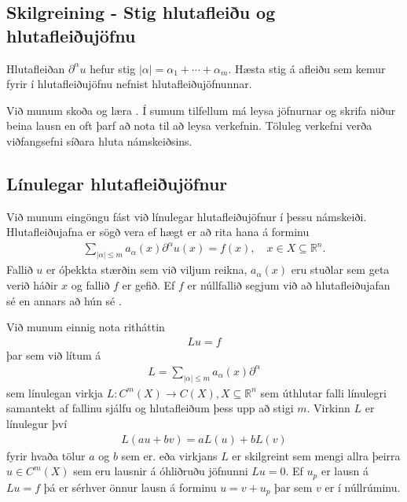 \documentclass[a4paper,10pt,icelandic]{sphinxmanual}
\begin{document}
\subsection{Skilgreining - Stig hlutafleiðu og hlutafleiðujöfnu}
\label{\detokenize{Kafli01:skilgreining-stig-hlutafleiu-og-hlutafleiujofnu}}
Hlutafleiðan \(\partial^\alpha u\) hefur stig \(|\alpha| = \alpha_1 + \cdots + \alpha_m\).  Hæsta stig á afleiðu sem kemur fyrir í hlutafleiðujöfnu nefnist  hlutafleiðujöfnunnar.

Við munum skoða  og læra . Í sumum tilfellum má leysa jöfnurnar og skrifa niður beina lausn en oft þarf að nota  til að leysa verkefnin. Töluleg verkefni verða viðfangsefni síðara hluta námskeiðsins.


\subsection{Línulegar hlutafleiðujöfnur}
\label{\detokenize{Kafli01:linulegar-hlutafleiujofnur}}
Við munum eingöngu fást við línulegar hlutafleiðujöfnur í þessu námskeiði. Hlutafleiðujafna er sögð vera  ef hægt er að rita hana á forminu
\begin{equation*}
\begin{split}\sum_{|\alpha|\leq m} a_\alpha(x) \partial^\alpha u(x) = f(x), \quad x\in X \subseteq \mathbb{R}^n.\end{split}
\end{equation*}
Fallið \(u\) er óþekkta stærðin sem við viljum reikna, \(a_\alpha(x)\) eru stuðlar sem geta verið háðir \(x\) og fallið \(f\) er gefið. Ef \(f\) er núllfallið segjum við að hlutafleiðujafan sé  en annars að hún sé .

Við munum einnig nota ritháttin
\begin{equation*}
\begin{split}Lu = f\end{split}
\end{equation*}
þar sem við lítum á
\begin{equation*}
\begin{split}L = \sum_{|\alpha|\leq m} a_\alpha(x) \partial^\alpha\end{split}
\end{equation*}
sem línulegan virkja \(L: C^m(X) \to C(X), X\subseteq \mathbb{R}^n\) sem úthlutar falli línulegri samantekt af fallinu sjálfu og hlutafleiðum þess upp að stigi \(m\). Virkinn \(L\) er línulegur því
\begin{equation*}
\begin{split}L(au + bv) = aL(u) + bL(v)\end{split}
\end{equation*}
fyrir hvaða tölur \(a\) og \(b\) sem er.  eða  virkjans \(L\) er skilgreint sem mengi allra þeirra \(u\in C^m(X)\) sem eru lausnir á óhliðruðu jöfnunni \(Lu=0\). Ef \(u_p\) er lausn á \(Lu = f\) þá er sérhver önnur lausn á forminu \(u = v+u_p\) þar sem \(v\) er í núllrúminu.
\end{document}

